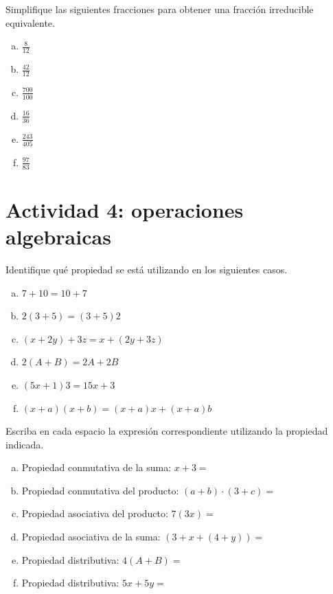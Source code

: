 \documentclass[11pt]{article}
\begin{document}
\begin{exercise}
Simplifique las siguientes fracciones para obtener una fracción irreducible equivalente.
\begin{multicols}{6}
    \begin{enumerate}[a)]
    \item $\frac{8}{12}$
    \item $\frac{42}{12}$
    \item $\frac{700}{100}$
    \item $\frac{16}{36}$
    \item $\frac{243}{405}$
    \item $\frac{97}{83}$
\end{enumerate}
\end{multicols}
\end{exercise}

\section*{Actividad 4: operaciones algebraicas}

\begin{exercise}
Identifique qué propiedad se está utilizando en los siguientes casos.
\begin{multicols}{2}
    \begin{enumerate}[a)]
        \item $7 + 10 = 10 + 7$
        \item $2(3+5) = (3+5)2$
        \item $(x+2y) +3z = x +(2y+3z)$
        \item $2(A+B) = 2A + 2B$
        \item $(5x+1)3 = 15x + 3$
        \item $(x+a)(x+b) = (x+a)x+(x+a)b$
    \end{enumerate}
\end{multicols}
\end{exercise}

\begin{exercise}
Escriba en cada espacio la expresión correspondiente utilizando la propiedad indicada.
\begin{enumerate}[a)]
\item Propiedad conmutativa de la suma: $x+3=$ \blank[width=3cm]{}
\item Propiedad conmutativa del producto: $(a+b) \cdot(3+c) =$ \blank[width=3cm]{}
\item Propiedad asociativa del producto: $7(3x) =$ \blank[width=3cm]{}
\item Propiedad asociativa de la suma: $(3+x+(4+y)) =$ \blank[width=3cm]{}
\item Propiedad distributiva: $4(A+B) =$ \blank[width=3cm]{}
\item Propiedad distributiva: $5x + 5y =$ \blank[width=3cm]{}
\end{enumerate}
\end{exercise}
\end{document}
